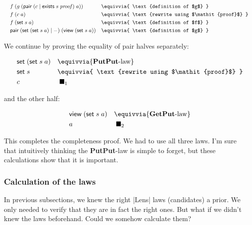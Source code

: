\documentclass{article}
\begin{document}
\begin{equation}
\begin{aligned}
\quad &f\; (g\; (\mathsf{pair}\;(c \mid \mathsf{exists}\; s\; \mathit{proof})\;a)) &&\equivvia{ \text{definition of $g$} } \\
      &f\; (c\; a) &&\equivvia{ \text{rewrite using $\mathit{proof}$} } \\
      &f\; (\mathsf{set}\;s\; a) &&\equivvia{ \text{definition of $f$} } \\
      &\mathsf{pair}\; (\mathsf{set}\; (\mathsf{set}\;s\; a) \mid -)\;(\mathsf{view}\;(\mathsf{set}\;s\;a)) &&\equivvia{ \text{definition of $g$} } \\
\end{aligned}
\end{equation}

We continue by proving the equality of pair halves separately:

\begin{equation}
\begin{aligned}
\quad &\mathsf{set}\; (\mathsf{set}\;s\; a)  &&\equivvia{ \text{\textbf{PutPut}-law} }  \\
      &\mathsf{set}\;s  &&\equivvia{ \text{rewrite using $\mathit{proof}$} }  \\
      &c &&\;\blacksquare_1
\end{aligned}
\end{equation}

and the other half:

\begin{equation}
\begin{aligned}
\quad &\mathsf{view}\;(\mathsf{set}\;s\;a) &&\equivvia{ \text{\textbf{GetPut}-law} }  \\
      &a &&\;\blacksquare_2
\end{aligned}
\end{equation}

This completes the completeness proof. We had to use all three laws.
I'm sure that intuitively thinking the \textbf{PutPut}-law is simple to forget,
but these calculations show that it is important.

\subsubsection{Calculation of the laws}

In previous subsections, we knew the right |Lens| laws (candidates) a prior.
We only needed to verify that they are in fact the right ones.
But what if we didn't knew the laws beforehand.
Could we somehow calculate them?
\end{document}
